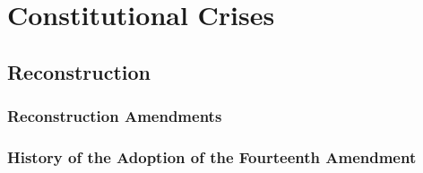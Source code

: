 \section{Constitutional Crises}

\subsection{Reconstruction}

\subsubsection{Reconstruction Amendments}

\subsubsection{History of the Adoption of the Fourteenth Amendment}

